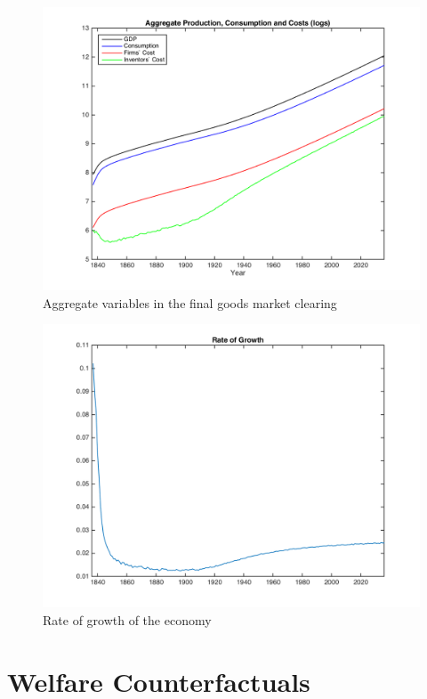 \documentclass[a4paper,11pt]{article}
\begin{document}
\begin{figure}[h!]
\begin{center}
\includegraphics[scale=.8]{figures/aggregates.png}
\caption{Aggregate variables in the final goods market clearing}
\end{center}
\end{figure}

\begin{figure}[h!]
\begin{center}
\includegraphics[scale=.8]{figures/growth.png}
\caption{Rate of growth of the economy}
\end{center}
\end{figure}

\section{Welfare Counterfactuals}
\end{document}
